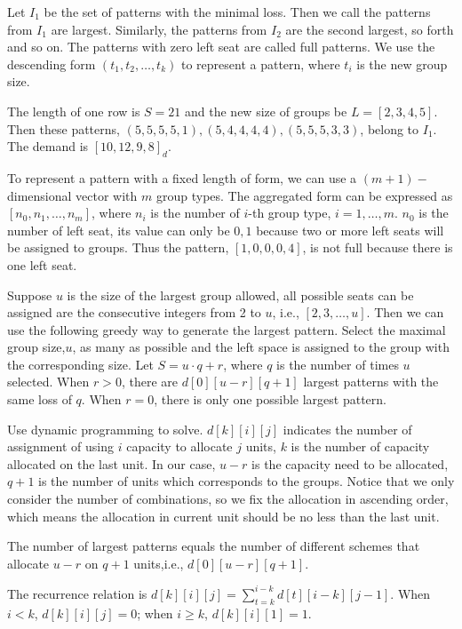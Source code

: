 Let $I_1$ be the set of patterns with the minimal loss. Then we call the patterns from $I_1$ are largest. Similarly, the patterns from $I_2$ are the second largest, so forth and so on. The patterns with zero left seat are called full patterns. We use the descending form $(t_1, t_2, \ldots, t_k)$ to represent a pattern, where $t_i$ is the new group size. 

\begin{example}\label{ex_largest}
  The length of one row is $S = 21$ and the new size of groups be $L = [2, 3, 4, 5]$. Then these patterns, $(5, 5, 5, 5, 1),(5, 4, 4, 4, 4),(5, 5, 5, 3, 3)$, belong to $I_1$. The demand is $[10, 12, 9, 8]_d$.
\end{example}

To represent a pattern with a fixed length of form, we can use a $(m+1)-$dimensional vector with $m$ group types. The aggregated form can be expressed as $[n_0, n_1, \ldots, n_m]$, where $n_i$ is the number of $i$-th group type, $i=1,\ldots,m$. 
$n_0$ is the number of left seat, its value can only be $0, 1$ because two or more left seats will be assigned to groups. Thus the pattern, $[1, 0, 0, 0, 4]$, is not full because there is one left seat.

Suppose $u$ is the size of the largest group allowed, all possible seats can be assigned are the consecutive integers from 2 to $u$, i.e., $[2,3,\ldots,u]$.
Then we can use the following greedy way to generate the largest pattern. Select the maximal group size,$u$, as many as possible and the left space is assigned to the group with the corresponding size. Let $S = u\cdot q + r$, where $q$ is the number of times $u$ selected. When $r>0$, there are $d[0][u-r][q+1]$ largest patterns with the same loss of $q$. When $r =0$, there is only one possible largest pattern.

Use dynamic programming to solve. $d[k][i][j]$ indicates the number of assignment of using $i$ capacity to allocate $j$ units, $k$ is the number of capacity allocated on the last unit. In our case, $u-r$ is the capacity need to be allocated, $q+1$ is the number of units which corresponds to the groups. Notice that we only consider the number of combinations, so we fix the allocation in ascending order, which means the allocation in current unit should be no less than the last unit.  

The number of largest patterns equals the number of different schemes that allocate $u-r$ on $q+1$ units,i.e., $d[0][u-r][q+1]$.

The recurrence relation is $d[k][i][j] = \sum_{t=k}^{i-k} d[t][i-k][j-1]$. 
When $i < k$, $d[k][i][j] =0$; when $i \geq k$, $d[k][i][1] =1$.

